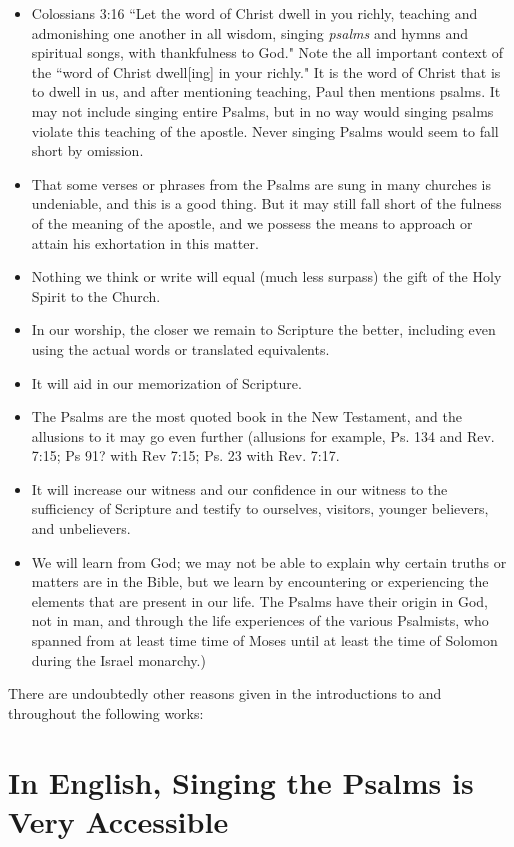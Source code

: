 \documentclass{article}
\begin{document}
\begin{itemize}
	\item Colossians 3:16 ``Let the word of Christ dwell in you richly, teaching and admonishing one another in all wisdom, singing \emph{psalms} and hymns and spiritual songs, with thankfulness to God." Note the all important context of the ``word of Christ dwell[ing] in your richly." It is the word of Christ that is to dwell in us, and after mentioning teaching, Paul then mentions psalms.  It may not include singing entire Psalms, but in no way would singing psalms violate this teaching of the apostle.  Never singing Psalms would seem to fall short by omission.
	\item That some verses or phrases from the Psalms are sung in many churches is undeniable, and this is a good thing.  But it may still fall short of the fulness of the meaning of the apostle, and we possess the means to approach or attain his exhortation in this matter.
	\item Nothing we think or write will equal (much less surpass) the gift of the Holy Spirit to the Church.
	\item In our worship, the closer we remain to Scripture the better, including even using the actual words or translated equivalents.
	\item It will aid in our memorization of Scripture.
	\item The Psalms are the most quoted book in the New Testament, and the allusions to it may go even further (allusions for example, Ps. 134 and Rev. 7:15; Ps 91? with Rev 7:15; Ps. 23 with Rev. 7:17.
	\item It will increase our witness and our confidence in our witness to the sufficiency of Scripture and testify to ourselves, visitors, younger believers, and unbelievers.  
	\item We will learn from God; we may not be able to explain why certain truths or matters are in the Bible, but we learn by encountering or experiencing the elements that are present in our life.  The Psalms have their origin in God, not in man, and through the life experiences of the various Psalmists, who spanned from at least time time of Moses until at least the time of Solomon during the Israel monarchy.)
\end{itemize}


There are undoubtedly other reasons given in the introductions to and throughout the following works:

\section{In English, Singing the Psalms is Very Accessible}
\end{document}
